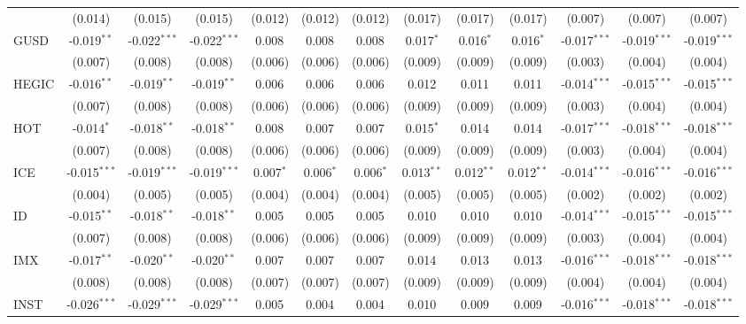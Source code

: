 \begin{table}[!htbp]
\begin{tabular}{@{\extracolsep{5pt}}lcccccccccccc}
  & (0.014) & (0.015) & (0.015) & (0.012) & (0.012) & (0.012) & (0.017) & (0.017) & (0.017) & (0.007) & (0.007) & (0.007) \\
 GUSD & -0.019$^{**}$ & -0.022$^{***}$ & -0.022$^{***}$ & 0.008$^{}$ & 0.008$^{}$ & 0.008$^{}$ & 0.017$^{*}$ & 0.016$^{*}$ & 0.016$^{*}$ & -0.017$^{***}$ & -0.019$^{***}$ & -0.019$^{***}$ \\
  & (0.007) & (0.008) & (0.008) & (0.006) & (0.006) & (0.006) & (0.009) & (0.009) & (0.009) & (0.003) & (0.004) & (0.004) \\
 HEGIC & -0.016$^{**}$ & -0.019$^{**}$ & -0.019$^{**}$ & 0.006$^{}$ & 0.006$^{}$ & 0.006$^{}$ & 0.012$^{}$ & 0.011$^{}$ & 0.011$^{}$ & -0.014$^{***}$ & -0.015$^{***}$ & -0.015$^{***}$ \\
  & (0.007) & (0.008) & (0.008) & (0.006) & (0.006) & (0.006) & (0.009) & (0.009) & (0.009) & (0.003) & (0.004) & (0.004) \\
 HOT & -0.014$^{*}$ & -0.018$^{**}$ & -0.018$^{**}$ & 0.008$^{}$ & 0.007$^{}$ & 0.007$^{}$ & 0.015$^{*}$ & 0.014$^{}$ & 0.014$^{}$ & -0.017$^{***}$ & -0.018$^{***}$ & -0.018$^{***}$ \\
  & (0.007) & (0.008) & (0.008) & (0.006) & (0.006) & (0.006) & (0.009) & (0.009) & (0.009) & (0.003) & (0.004) & (0.004) \\
 ICE & -0.015$^{***}$ & -0.019$^{***}$ & -0.019$^{***}$ & 0.007$^{*}$ & 0.006$^{*}$ & 0.006$^{*}$ & 0.013$^{**}$ & 0.012$^{**}$ & 0.012$^{**}$ & -0.014$^{***}$ & -0.016$^{***}$ & -0.016$^{***}$ \\
  & (0.004) & (0.005) & (0.005) & (0.004) & (0.004) & (0.004) & (0.005) & (0.005) & (0.005) & (0.002) & (0.002) & (0.002) \\
 ID & -0.015$^{**}$ & -0.018$^{**}$ & -0.018$^{**}$ & 0.005$^{}$ & 0.005$^{}$ & 0.005$^{}$ & 0.010$^{}$ & 0.010$^{}$ & 0.010$^{}$ & -0.014$^{***}$ & -0.015$^{***}$ & -0.015$^{***}$ \\
  & (0.007) & (0.008) & (0.008) & (0.006) & (0.006) & (0.006) & (0.009) & (0.009) & (0.009) & (0.003) & (0.004) & (0.004) \\
 IMX & -0.017$^{**}$ & -0.020$^{**}$ & -0.020$^{**}$ & 0.007$^{}$ & 0.007$^{}$ & 0.007$^{}$ & 0.014$^{}$ & 0.013$^{}$ & 0.013$^{}$ & -0.016$^{***}$ & -0.018$^{***}$ & -0.018$^{***}$ \\
  & (0.008) & (0.008) & (0.008) & (0.007) & (0.007) & (0.007) & (0.009) & (0.009) & (0.009) & (0.004) & (0.004) & (0.004) \\
 INST & -0.026$^{***}$ & -0.029$^{***}$ & -0.029$^{***}$ & 0.005$^{}$ & 0.004$^{}$ & 0.004$^{}$ & 0.010$^{}$ & 0.009$^{}$ & 0.009$^{}$ & -0.016$^{***}$ & -0.018$^{***}$ & -0.018$^{***}$ \\

\end{tabular}
\end{table}
